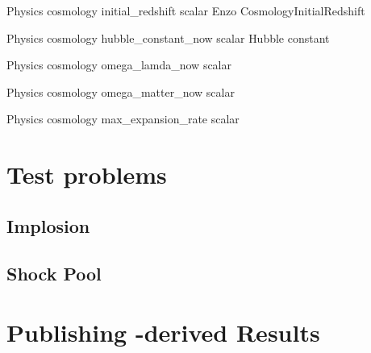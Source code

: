 \documentclass{article}
\begin{document}
\Parameter
{Physics}
{cosmology}
{initial\_redshift}
{scalar}
{}
{Enzo CosmologyInitialRedshift}
{}
{}
 		 	 	
\Parameter
{Physics}
{cosmology}
{hubble\_constant\_now}
{scalar}
{}
{Hubble constant}
{}
{}

\Parameter
{Physics}
{cosmology}
{omega\_lamda\_now}
{scalar}
{}
{}
{}
{}

\Parameter
{Physics}
{cosmology}
{omega\_matter\_now}
{scalar}
{}
{}
{}
{}

\Parameter
{Physics}
{cosmology}
{max\_expansion\_rate}
{scalar}
{}
{}
{}
{}

\section{Test problems}
\subsection{Implosion}


\subsection{Shock Pool}



\section{Publishing \cello-derived Results}
\end{document}
